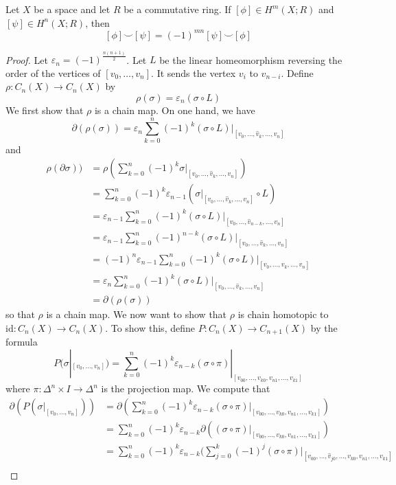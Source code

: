 \documentclass[a4paper]{article}
\begin{document}
\begin{prp}{}{} Let $X$ be a space and let $R$ be a commutative ring. If $[\phi]\in H^m(X;R)$ and $[\psi]\in H^n(X;R)$, then $$[\phi]\smile[\psi]=(-1)^{mn}[\psi]\smile[\phi]$$ \tcbline
\begin{proof}
Let $\varepsilon_n=(-1)^{\frac{n(n+1)}{2}}$. Let $L$ be the linear homeomorphism reversing the order of the vertices of $[v_0,\dots,v_n]$. It sends the vertex $v_i$ to $v_{n-i}$. Define $\rho:C_n(X)\to C_n(X)$ by $$\rho(\sigma)=\varepsilon_n(\sigma\circ L)$$ We first show that $\rho$ is a chain map. On one hand, we have $$\partial(\rho(\sigma))=\varepsilon_n\sum_{k=0}^n(-1)^k(\sigma\circ L)|_{[v_0,\dots,\widehat{v}_k,\dots,v_n]}$$ and 
\begin{align*}
\rho(\partial\sigma))&=\rho\left(\sum_{k=0}^n(-1)^k\sigma|_{[v_0,\dots,\widehat{v}_k,\dots,v_n]}\right)\\
&=\sum_{k=0}^n(-1)^k\varepsilon_{n-1}(\sigma|_{[v_0,\dots,\widehat{v}_k,\dots,v_n]}\circ L)\\
&=\varepsilon_{n-1}\sum_{k=0}^n(-1)^k(\sigma\circ L)|_{[v_0,\dots,\widehat{v}_{n-k},\dots,v_n]}\\
&=\varepsilon_{n-1}\sum_{k=0}^n(-1)^{n-k}(\sigma\circ L)|_{[v_0,\dots,\widehat{v}_k,\dots,v_n]}\\
&=(-1)^n\varepsilon_{n-1}\sum_{k=0}^n(-1)^k(\sigma\circ L)|_{[v_0,\dots,\widehat{v}_k,\dots,v_n]}\\
&=\varepsilon_n\sum_{k=0}^n(-1)^k(\sigma\circ L)|_{[v_0,\dots,\widehat{v}_k,\dots,v_n]}\\
&=\partial(\rho(\sigma))
\end{align*}
so that $\rho$ is a chain map. We now want to show that $\rho$ is chain homotopic to $\text{id}:C_n(X)\to C_n(X)$. To show this, define $P:C_n(X)\to C_{n+1}(X)$ by the formula $$P(\sigma|_{[v_0,\dots,v_n]})=\sum_{k=0}^n(-1)^k\varepsilon_{n-k}(\sigma\circ\pi)|_{[v_{00},\dots,v_{k0},v_{n1},\dots,v_{k1}]}$$ where $\pi:\Delta^n\times I\to\Delta^n$ is the projection map. We compute that 
\begin{align*}
\partial(P(\sigma|_{[v_0,\dots,v_n]}))&=\partial\left(\sum_{k=0}^n(-1)^k\varepsilon_{n-k}(\sigma\circ\pi)|_{[v_{00},\dots,v_{k0},v_{n1},\dots,v_{k1}]}\right)\\
&=\sum_{k=0}^n(-1)^k\varepsilon_{n-k}\partial((\sigma\circ\pi)|_{[v_{00},\dots,v_{k0},v_{n1},\dots,v_{k1}]})\\
&=\sum_{k=0}^n(-1)^k\varepsilon_{n-k}\Big(\sum_{j=0}^k(-1)^j(\sigma\circ\pi)|_{[v_{00},\dots,\widehat{v}_{j0},\dots,v_{k0},v_{n1},\dots,v_{k1}]}\\

\end{align*}
\end{proof}
\end{prp}
\end{document}
